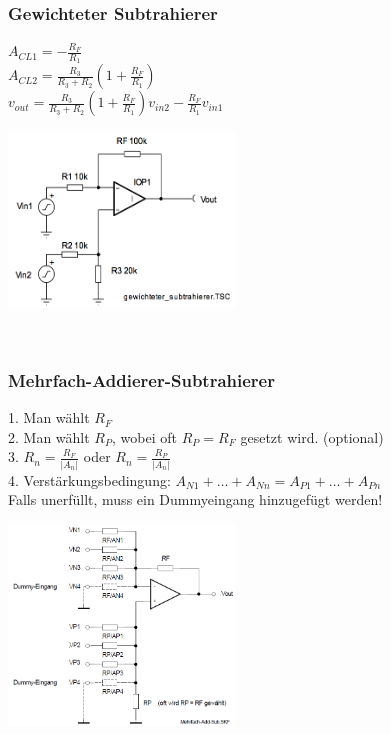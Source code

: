 		\subsubsection{Gewichteter Subtrahierer}
			\begin{minipage}[b]{12cm}
            	$A_{CL1}=- \frac{R_F}{R_1}$\\
            	$A_{CL2}=
           		\frac{R_3}{R_3+R_2}\left(1+\frac{R_F}{R_1}\right)$\\
            	$v_{out}=
            	\frac{R_3}{R_3+R_2}\left(1+\frac{R_F}{R_1}\right)
            	v_{in2}-\frac{R_F}{R_1}v_{in1}$\\
      	\end{minipage}
			\begin{minipage}{6cm}
            	\includegraphics[width=6cm]{./images/gewichtsub.png}
            \end{minipage}\\


		\subsubsection{Mehrfach-Addierer-Subtrahierer} 		
		\begin{minipage}[b]{12cm}
		1. Man wählt $R_{F}$\\
		2. Man wählt $R_{P}$, wobei oft $R_{P}=R_{F}$ gesetzt wird. (optional)\\
		3. $R_{n}=\frac{R_{F}}{\left|A_{n}\right|}$ oder
			$R_{n}=\frac{R_{P}}{\left|A_{n}\right|}$\\ 
		4. Verstärkungsbedingung: $A_{N1} +
		\ldots + A_{Nn} = A_{P1} + \ldots + A_{Pn}$ \\Falls unerfüllt, muss ein Dummyeingang hinzugefügt werden!
		\end{minipage}
		\begin{minipage}{6cm}
          	\includegraphics[width=6cm]{./images/mehrfach-addierer-subtrahierer.png} 
        \end{minipage}\\

